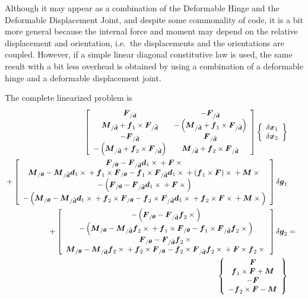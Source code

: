 \documentclass[10pt,dvips,fleqn]{report}
\newcommand{\T}[1]{\boldsymbol{#1}}
\begin{document}
Although it may appear as a combination of the Deformable Hinge
and the Deformable Displacement Joint, and despite some commonality
of code, it is a bit more general because the internal force
and moment may depend on the relative displacement and orientation,
i.e.\ the displacements and the orientations are coupled.
However, if a simple linear diagonal constitutive law is used,
the same result with a bit less overhead is obtained by using
a combination of a deformable hinge and a deformable displacement joint.

\noindent
The complete linearized problem is
\begin{eqnarray*}
	\sqbr{\matr{cc}{
		\T{F}_{/\tilde{\T{d}}} & - \T{F}_{/\tilde{\T{d}}} \\
		\T{M}_{/\tilde{\T{d}}} + \T{f}_1 \times \T{F}_{/\tilde{\T{d}}} &
			-\plbr{\T{M}_{/\tilde{\T{d}}} + \T{f}_1 \times \T{F}_{/\tilde{\T{d}}}} \\
		- \T{F}_{/\tilde{\T{d}}} & \T{F}_{/\tilde{\T{d}}} \\
		- \plbr{\T{M}_{/\tilde{\T{d}}} + \T{f}_2 \times \T{F}_{/\tilde{\T{d}}}} &
			\T{M}_{/\tilde{\T{d}}} + \T{f}_2 \times \T{F}_{/\tilde{\T{d}}}
	}}\cubr{\cvvect{
		\delta\T{x}_1 \\
		\delta\T{x}_2 \\
	}} \\
	\mbox{} + \sqbr{\cvvect{
		\T{F}_{/\T{\theta}} - \T{F}_{/\tilde{\T{d}}} \T{d}_1\times{} + \T{F}\times{} \\
		\T{M}_{/\T{\theta}} - \T{M}_{/\tilde{\T{d}}} \T{d}_1\times{} 
			+ \T{f}_1\times\T{F}_{/\T{\theta}}
			- \T{f}_1\times\T{F}_{/\tilde{\T{d}}} \T{d}_1\times{}
			+ \plbr{\T{f}_1\times\T{F}}\times{} + \T{M}\times{} \\
		- \plbr{\T{F}_{/\T{\theta}} - \T{F}_{/\tilde{\T{d}}} \T{d}_1\times{} + \T{F}\times{}} \\
		- \plbr{\T{M}_{/\T{\theta}} - \T{M}_{/\tilde{\T{d}}} \T{d}_1\times{}
			+ \T{f}_2\times\T{F}_{/\T{\theta}}
			- \T{f}_2\times\T{F}_{/\tilde{\T{d}}} \T{d}_1\times{}
			+ \T{f}_2\times\T{F}\times{} + \T{M}\times{}}
	}}\delta\T{g}_1 \\
	\mbox{} + \sqbr{\cvvect{
		- \plbr{\T{F}_{/\T{\theta}} - \T{F}_{/\tilde{\T{d}}} \T{f}_2\times{}} \\
		- \plbr{\T{M}_{/\T{\theta}} - \T{M}_{/\tilde{\T{d}}} \T{f}_2\times{}
			+ \T{f}_1\times\T{F}_{/\T{\theta}}
			- \T{f}_1\times\T{F}_{/\tilde{\T{d}}} \T{f}_2\times{}} \\
		\T{F}_{/\T{\theta}} - \T{F}_{/\tilde{\T{d}}} \T{f}_2\times{} \\
		\T{M}_{/\T{\theta}} - \T{M}_{/\tilde{\T{d}}} \T{f}_2\times{}
			+ \T{f}_2\times\T{F}_{/\T{\theta}}
			- \T{f}_2\times\T{F}_{/\tilde{\T{d}}} \T{f}_2\times{}
			+ \T{F}\times\T{f}_2\times{}
	}}\delta\T{g}_2
	& = & \\
	\cubr{\cvvect{
		\T{F} \\
		\T{f}_1 \times \T{F} + \T{M} \\
		- \T{F} \\
		- \T{f}_2 \times \T{F} - \T{M}
	}} & &
\end{eqnarray*}
\end{document}

